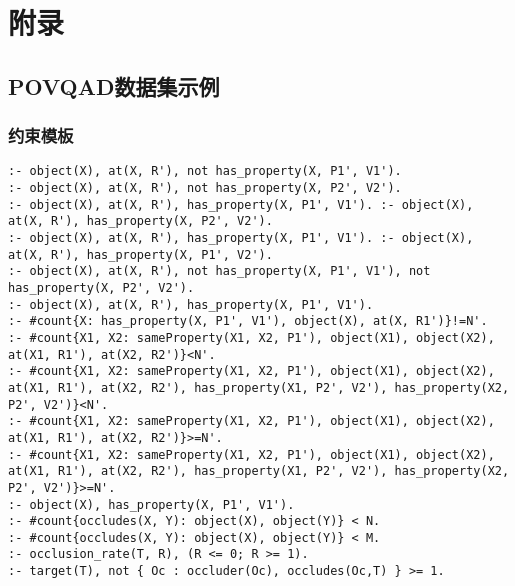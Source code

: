 \chapter{附录}
\section{POVQAD数据集示例}
\subsection{约束模板}
\label{appendix:constraints}
\begin{lstlisting}
:- object(X), at(X, R'), not has_property(X, P1', V1'). 
:- object(X), at(X, R'), not has_property(X, P2', V2').
:- object(X), at(X, R'), has_property(X, P1', V1'). :- object(X), at(X, R'), has_property(X, P2', V2').
:- object(X), at(X, R'), has_property(X, P1', V1'). :- object(X), at(X, R'), has_property(X, P1', V2').
:- object(X), at(X, R'), not has_property(X, P1', V1'), not has_property(X, P2', V2').
:- object(X), at(X, R'), has_property(X, P1', V1').
:- #count{X: has_property(X, P1', V1'), object(X), at(X, R1')}!=N'.
:- #count{X1, X2: sameProperty(X1, X2, P1'), object(X1), object(X2), at(X1, R1'), at(X2, R2')}<N'.
:- #count{X1, X2: sameProperty(X1, X2, P1'), object(X1), object(X2), at(X1, R1'), at(X2, R2'), has_property(X1, P2', V2'), has_property(X2, P2', V2')}<N'.
:- #count{X1, X2: sameProperty(X1, X2, P1'), object(X1), object(X2), at(X1, R1'), at(X2, R2')}>=N'.
:- #count{X1, X2: sameProperty(X1, X2, P1'), object(X1), object(X2), at(X1, R1'), at(X2, R2'), has_property(X1, P2', V2'), has_property(X2, P2', V2')}>=N'.
:- object(X), has_property(X, P1', V1').
:- #count{occludes(X, Y): object(X), object(Y)} < N.
:- #count{occludes(X, Y): object(X), object(Y)} < M.
:- occlusion_rate(T, R), (R <= 0; R >= 1).
:- target(T), not { Oc : occluder(Oc), occludes(Oc,T) } >= 1.
\end{lstlisting}
